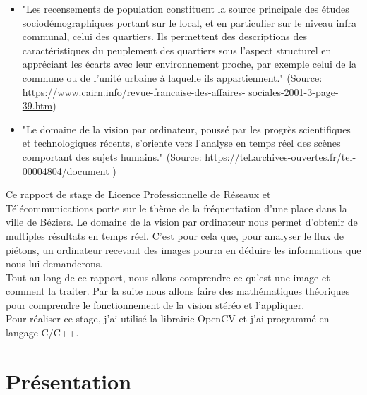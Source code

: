 \documentclass[12pt, french]{report}
\begin{document}
    \begin{itemize}
        \item "Les recensements de population constituent la source principale des études sociodémographiques portant sur le local, et en particulier sur le niveau infra communal, celui des quartiers. Ils permettent des descriptions des caractéristiques du peuplement des quartiers sous l’aspect structurel en appréciant les écarts avec leur environnement proche, par exemple celui de la commune ou de l’unité urbaine à laquelle ils appartiennent."
        (Source: \href{https://www.cairn.info/revue-francaise-des-affaires- sociales-2001-3-page-39.htm}{https://www.cairn.info/revue-francaise-des-affaires- sociales-2001-3-page-39.htm})\\
        

    \item "Le domaine de la vision par ordinateur, poussé par les progrès scientifiques et technologiques récents, s’oriente vers l’analyse en temps réel des scènes comportant des sujets humains." (Source: \href{https://tel.archives-ouvertes.fr/tel-00004804/document}{https://tel.archives-ouvertes.fr/tel-00004804/document} ) %
    \\
    \end{itemize}
        
    Ce rapport de stage de Licence Professionnelle de Réseaux et Télécommunications porte sur le thème de la fréquentation d'une place dans la ville de Béziers. Le domaine de la vision par ordinateur nous permet d'obtenir de multiples résultats en temps réel. C'est pour cela que, pour analyser le flux de piétons, un ordinateur recevant des images pourra en déduire les informations que nous lui demanderons. \\
    Tout au long de ce rapport, nous allons comprendre ce qu'est une image et comment la traiter. Par la suite nous allons faire des mathématiques théoriques pour comprendre le fonctionnement de la vision stéréo et l'appliquer. \\
    Pour réaliser ce stage, j'ai utilisé la librairie OpenCV et j'ai programmé en langage C/C++.

\newpage
\section{Présentation}
\end{document}
